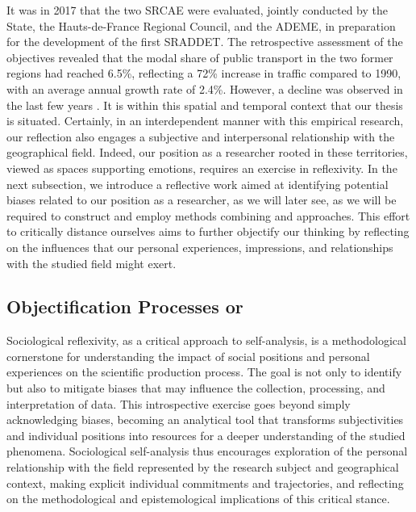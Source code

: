\begin{refsegment}
It was in 2017 that the two \acrshort{SRCAE} were evaluated, jointly conducted by the State, the Hauts-de-France Regional Council, and the \acrfull{ADEME}, in preparation for the development of the first \acrshort{SRADDET}. The retrospective assessment of the objectives revealed that the modal share of public transport in the two former regions had reached 6.5\%, reflecting a 72\% increase in traffic compared to 1990, with an average annual growth rate of 2.4\%. However, a decline was observed in the last few years \textcolor{blue}{\autocite[164]{region_hauts-de-france_evaluation_2017}}. It is within this spatial and temporal context that our thesis is situated. Certainly, in an interdependent manner with this empirical research, our reflection also engages a subjective and interpersonal relationship with the geographical field. Indeed, our position as a researcher rooted in these territories, viewed as spaces supporting emotions, requires an exercise in reflexivity. In the next subsection, we introduce a reflective work aimed at identifying potential biases related to our position as a researcher, as we will later see, as we will be required to construct and employ methods combining  and  approaches. This effort to critically distance ourselves aims to further objectify our thinking by reflecting on the influences that our personal experiences, impressions, and relationships with the studied field might exert.%

\subsection{Objectification Processes or 
    \label{chap3:auto-analyse-sociologique}
    }

Sociological reflexivity, as a critical approach to self-analysis, is a methodological cornerstone for understanding the impact of social positions and personal experiences on the scientific production process. The goal is not only to identify but also to mitigate biases that may influence the collection, processing, and interpretation of data. This introspective exercise goes beyond simply acknowledging biases, becoming an analytical tool that transforms subjectivities and individual positions into resources for a deeper understanding of the studied phenomena. Sociological self-analysis thus encourages exploration of the personal relationship with the field represented by the research subject and geographical context, making explicit individual commitments and trajectories, and reflecting on the methodological and epistemological implications of this critical stance.%


\end{refsegment}
